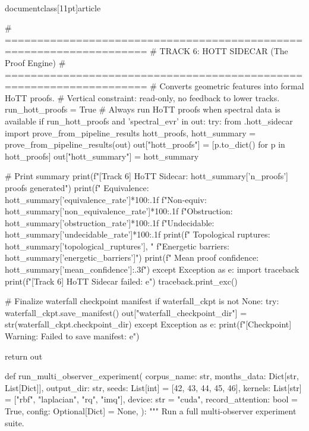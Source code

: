 \\documentclass[11pt]{article}
\begin{document}
\begin{CodeBlock}
        # ====================================================================
        # TRACK 6: HOTT SIDECAR (The Proof Engine)
        # ====================================================================
        # Converts geometric features into formal HoTT proofs.
        # Vertical constraint: read-only, no feedback to lower tracks.
        run_hott_proofs = True  # Always run HoTT proofs when spectral data is available
        if run_hott_proofs and 'spectral_evr' in out:
            try:
                from .hott_sidecar import prove_from_pipeline_results
                hott_proofs, hott_summary = prove_from_pipeline_results(out)
                out["hott_proofs"] = [p.to_dict() for p in hott_proofs]
                out["hott_summary"] = hott_summary

                # Print summary
                print(f"[Track 6] HoTT Sidecar: {hott_summary['n_proofs']} proofs generated")
                print(f"  Equivalence: {hott_summary['equivalence_rate']*100:.1f}%
                      f"Non-equiv: {hott_summary['non_equivalence_rate']*100:.1f}%
                      f"Obstruction: {hott_summary['obstruction_rate']*100:.1f}%
                      f"Undecidable: {hott_summary['undecidable_rate']*100:.1f}%
                print(f"  Topological ruptures: {hott_summary['topological_ruptures']}, "
                      f"Energetic barriers: {hott_summary['energetic_barriers']}")
                print(f"  Mean proof confidence: {hott_summary['mean_confidence']:.3f}")
            except Exception as e:
                import traceback
                print(f"[Track 6] HoTT Sidecar failed: {e}")
                traceback.print_exc()

        # Finalize waterfall checkpoint manifest
        if waterfall_ckpt is not None:
            try:
                waterfall_ckpt.save_manifest()
                out["waterfall_checkpoint_dir"] = str(waterfall_ckpt.checkpoint_dir)
            except Exception as e:
                print(f"[Checkpoint] Warning: Failed to save manifest: {e}")

        return out


def run_multi_observer_experiment(
    corpus_name: str,
    months_data: Dict[str, List[Dict]],
    output_dir: str,
    seeds: List[int] = [42, 43, 44, 45, 46],
    kernels: List[str] = ["rbf", "laplacian", "rq", "imq"],
    device: str = "cuda",
    record_attention: bool = True,
    config: Optional[Dict] = None,
):
    """
    Run a full multi-observer experiment suite.


\end{CodeBlock}
\end{document}
